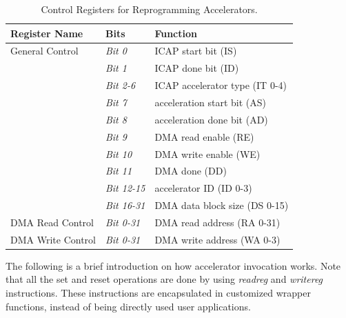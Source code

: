 \begin{table}[ht]
\scriptsize
\begin{center}
\begin{tabular}{|l|l|l|}
\hline 
\textbf{Register Name} & \textbf{Bits} & \textbf{Function}\\ 
\hline 
\hline
General Control &{\em Bit 0}   & ICAP start bit (IS)\\ 
\hline 
 &{\em Bit 1}   &  ICAP done bit (ID)\\ 
\hline 
 &{\em Bit 2-6} & ICAP accelerator type (IT 0-4)\\ 
\hline 
 &{\em Bit 7}   & acceleration start bit (AS)\\ 
\hline 
 &{\em Bit 8}   & acceleration done bit (AD)\\ 
\hline 
 &{\em Bit 9}   & DMA read enable (RE)\\ 
\hline 
 &{\em Bit 10}  & DMA write enable (WE)\\ 
\hline 
 &{\em Bit 11}  & DMA done (DD)\\
\hline
 &{\em Bit 12-15} & accelerator ID (ID 0-3)\\
\hline
 &{\em Bit 16-31} & DMA data block size (DS 0-15)\\
\hline
DMA Read Control &{\em Bit 0-31}  & DMA read address (RA 0-31)\\
\hline
DMA Write Control &{\em Bit 0-31} & DMA write address (WA 0-3)\\
\hline
\end{tabular} 
\caption{Control Registers for Reprogramming Accelerators.}
\label{tbl_AccReg}
\end{center}
\end{table}

The following is a brief introduction on how accelerator invocation
works. Note that all the set and reset operations are done by using
{\em readreg} and {\em writereg} instructions. These instructions are
encapsulated in customized wrapper functions, instead of being
directly used user applications.

